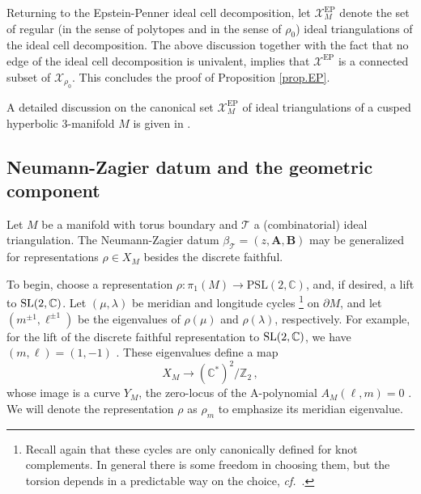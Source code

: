 \documentclass[12pt]{amsart}
\newcommand{\lbl}{\label}
\theoremstyle{definition}
\def\BZ{\mathbb Z}
\def\BC{\mathbb C}
\def\calX{\mathcal X}
\def\longto{\longrightarrow}
\def\SL{\mathrm{SL}}
\def\PSL{\mathrm{PSL}}
\def\pt{\partial}
\def\be{  \begin{equation} }
\def\ee{  \end{equation} }
\def\EP{\mathrm{EP}}
\newcommand{\CT}{\mathcal{T}}
\newcommand{\C}{\mathbb{C}}
\newcommand{\cf}{\emph{cf.}}
\newcommand{\mb}{\mathbf}
\numberwithin{equation}{section}
\begin{document}
Returning to the Epstein-Penner ideal cell decomposition, let
$\calX^{\EP}_M$ denote the set of regular (in the sense of polytopes and
in the sense of $\rho_0$) ideal triangulations of the ideal cell decomposition.
The above discussion together with the fact that no edge of the ideal cell
decomposition is univalent, implies that $\calX^{\EP}$ is a connected
subset of $\calX_{\rho_0}$. This concludes the proof of Proposition
\ref{prop.EP}.

A detailed discussion on the canonical set $\calX^{\EP}_M$ of ideal 
triangulations of a cusped hyperbolic 3-manifold $M$ is given in 
\cite[Sec.6]{GHRS}.




\subsection{Neumann-Zagier datum and the geometric component}
\lbl{sub.GE}


Let $M$ be a manifold with torus boundary and $\CT$ a (combinatorial) 
ideal triangulation. The Neumann-Zagier datum 
$\beta_\CT=(z,\mb A,\mb B)$ may be generalized for representations $\rho\in X_M$ 
besides the discrete faithful.


To begin, choose a representation $\rho:\pi_1(M)\longto \PSL(2,\BC)$, and, if desired, a lift to ${\rm SL}(2,\BC)$. Let $(\mu,\lambda)$ be meridian and longitude cycles%
%
\footnote{Recall again that these cycles are only canonically defined for knot complements. In general there is some freedom in choosing them, but the torsion depends in a predictable way on the choice, \cf\ \cite{Ya}.} %
%
on $\pt M$, and let $(m^{\pm 1},\ell^{\pm 1})$ be the eigenvalues of $\rho(\mu)$ and $\rho(\lambda)$, respectively. For example, for the lift of the discrete faithful representation to ${\rm SL}(2,\C)$, we have $(m,\ell)=(1,-1)$ \cite{Calegari}. These eigenvalues define a map
%
\be \lbl{Amap} X_M \longto (\BC^*)^2/\BZ_2\,,\ee
%
whose image is a curve $Y_M$, the zero-locus of the A-polynomial $A_M(\ell,m)=0$ \cite{CCGLS}. 
We will denote the representation $\rho$ as $\rho_m$ to emphasize its meridian eigenvalue.
\end{document}
